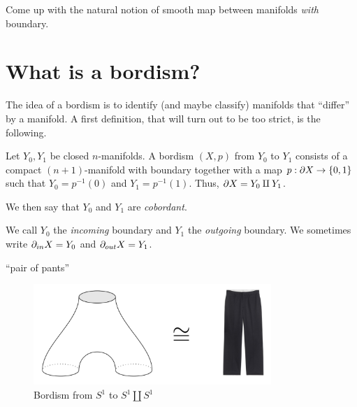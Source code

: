 \begin{exercise}
    Come up with the natural notion of smooth map between manifolds \emph{with} boundary. 
\end{exercise}

\section{What is a bordism?}

The idea of a bordism is to identify (and maybe classify) manifolds that ``differ'' by a manifold. A first definition, that will turn out to be too strict, is the following.
\begin{defn}
\label{Define Bordism}
    Let $Y_0, Y_1$ be closed $n$-manifolds. A bordism $(X,p)$ from $Y_0$ to $Y_1$ consists of a compact $(n+1)$-manifold with boundary together with a map $p: \partial X \to \{0,1\}$ such that $Y_0 = p^{-1}(0)$ and $Y_1 = p^{-1}(1)$. Thus, $\partial X = Y_0 \amalg Y_1$.

    \noindent We then say that $Y_0$ and $Y_1$ are \textit{cobordant}.
\end{defn}
\noindent We call $Y_0$ the \textit{incoming} boundary and $Y_1$ the \textit{outgoing} boundary. We sometimes write $\partial_{in} X = Y_0$ and $\partial_{out} X = Y_1$.

\begin{ex}
    ``pair of pants'' %
    \begin{figure}[!ht]
        \centering
        \captionsetup{labelformat=empty, format = hang}
        \begin{measuredfigure}
            \includegraphics[width=9cm]{images/Lecture 2/pants_topological.png} 
            \caption{\small{Bordism from $S^1$ to $S^1\amalg S^1$}}
        \end{measuredfigure}
    \end{figure}
\end{ex}

